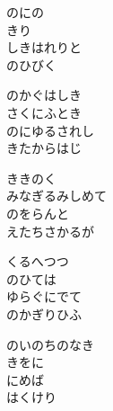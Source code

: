 \documentclass[10pt,b5j]{tarticle} %
\begin{document}
\vspace{1.5em} %
\newcommand{\linespace}{0.5em} %
\newcommand{\blocksize}{0.5\hsize} %
\begin{enumerate} %
    \begin{minipage}[c]{\blocksize}
    
        \vspace{\linespace}
        \item
        のにの\\
        きり\\
        しきはれりと\\
        のひびく
        
        \vspace{\linespace}
        \item
        のかぐはしき\\
        さくにふとき\\
        のにゆるされし\\
        きたからはじ
        
        \vspace{\linespace}
        \item
        ききのく\\
        みなぎるみしめて\\
        のをらんと\\
        えたちさかるが
        
        \vspace{\linespace}
        \item
        くるへつつ\\
        のひては\\
        ゆらぐにでて\\
        のかぎりひふ
        
        \vspace{\linespace}
        \item
        のいのちのなき\\
        きをに\\
        にめば\\
        はくけり
        

\end{minipage}
\end{enumerate}
\end{document}
